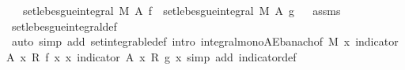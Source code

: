 \begin{isabellebody}
\ \ \ {\isachardoublequoteopen}set{\isacharunderscore}{\kern0pt}lebesgue{\isacharunderscore}{\kern0pt}integral\ M\ A\ f\ {\isasymle}\ set{\isacharunderscore}{\kern0pt}lebesgue{\isacharunderscore}{\kern0pt}integral\ M\ A\ g{\isachardoublequoteclose}%
\isadelimproof
\ %
\endisadelimproof
%
\isatagproof
{}\isamarkupfalse%
\ assms\ \isamarkupfalse%
\ set{\isacharunderscore}{\kern0pt}lebesgue{\isacharunderscore}{\kern0pt}integral{\isacharunderscore}{\kern0pt}def\ \isamarkupfalse%
\ {\isacharparenleft}{\kern0pt}auto\ simp\ add{\isacharcolon}{\kern0pt}\ set{\isacharunderscore}{\kern0pt}integrable{\isacharunderscore}{\kern0pt}def\ intro{\isacharbang}{\kern0pt}{\isacharcolon}{\kern0pt}\ integral{\isacharunderscore}{\kern0pt}mono{\isacharunderscore}{\kern0pt}AE{\isacharunderscore}{\kern0pt}banach{\isacharbrackleft}{\kern0pt}of\ M\ {\isachardoublequoteopen}{\isasymlambda}x{\isachardot}{\kern0pt}\ indicator\ A\ x\ {\isacharasterisk}{\kern0pt}\isactrlsub R\ f\ x{\isachardoublequoteclose}\ {\isachardoublequoteopen}{\isasymlambda}x{\isachardot}{\kern0pt}\ indicator\ A\ x\ {\isacharasterisk}{\kern0pt}\isactrlsub R\ g\ x{\isachardoublequoteclose}{\isacharbrackright}{\kern0pt}{\isacharcomma}{\kern0pt}\ simp\ add{\isacharcolon}{\kern0pt}\ indicator{\isacharunderscore}{\kern0pt}def{\isacharparenright}{\kern0pt}%
\endisatagproof
{\isafoldproof}%
%
\isadelimproof
%
\endisadelimproof
\isanewline
%
\isadelimtheory
\isanewline
%
\endisadelimtheory
%
\isatagtheory
{}\isamarkupfalse%
%
\endisatagtheory
{\isafoldtheory}%
%
\isadelimtheory
%
\endisadelimtheory
%
\end{isabellebody}%
\endinput

